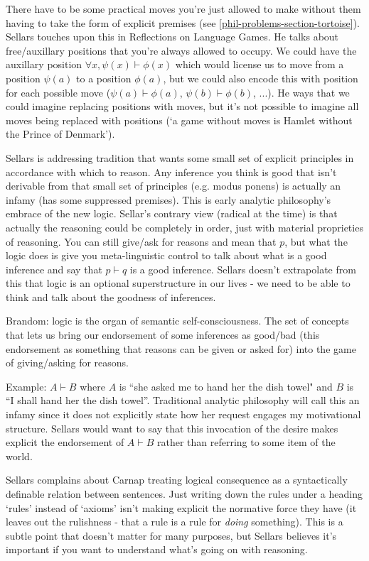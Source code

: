 \documentclass[12pt,a4paper]{report}
\begin{document}
There have to be some practical moves you're just allowed to make without them having to take the form of explicit premises (see \ref{phil-problems-section-tortoise}). Sellars touches upon this in Reflections on Language Games. He talks about free/auxillary positions that you're always allowed to occupy. We could have the auxillary position $\forall x, \psi(x)\vdash \phi(x)$ which would license us to move from a position $\psi(a)$ to a position $\phi(a)$, but we could also encode this with position for each possible move ($\psi(a)\vdash \phi(a)$, $\psi(b)\vdash\phi(b)$, ...). He ways that we could imagine replacing positions with moves, but it's not possible to imagine all moves being replaced with positions (`a game without moves is Hamlet without the Prince of Denmark').

Sellars is addressing tradition that wants some small set of explicit principles in accordance with which to reason. Any inference you think is good that isn't derivable from that small set of principles (e.g. modus ponens) is actually an infamy (has some suppressed premises). This is early analytic philosophy's embrace of the new logic. Sellar's contrary view (radical at the time) is that actually the reasoning could be completely in order, just with material proprieties of reasoning. You can still give/ask for reasons and mean that $p$, but what the logic does is give you meta-linguistic control to talk about what is a good inference and say that $p \vdash q$ is a good inference. Sellars doesn't extrapolate from this that logic is an optional superstructure in our lives - we need to be able to think and talk about the goodness of inferences.

Brandom: logic is the organ of semantic self-consciousness. The set of concepts that lets us bring our endorsement of some inferences as good/bad (this endorsement as something that reasons can be given or asked for) into the game of giving/asking for reasons.

Example: $A\vdash B$ where $A$ is ``she asked me to hand her the dish towel" and $B$ is ``I shall hand her the dish towel''. Traditional analytic philosophy will call this an infamy since it does not explicitly state how her request engages my motivational structure. Sellars would want to say that this invocation of the desire makes explicit the endorsement of $A \vdash B$ rather than referring to some item of the world.

Sellars complains about Carnap treating logical consequence as a syntactically definable relation between sentences. Just writing down the rules under a heading `rules' instead of `axioms' isn't making explicit the normative force they have (it leaves out the rulishness - that a rule is a rule for \emph{doing} something). This is a subtle point that doesn't matter for many purposes, but Sellars believes it's important if you want to understand what's going on with reasoning.
\end{document}
